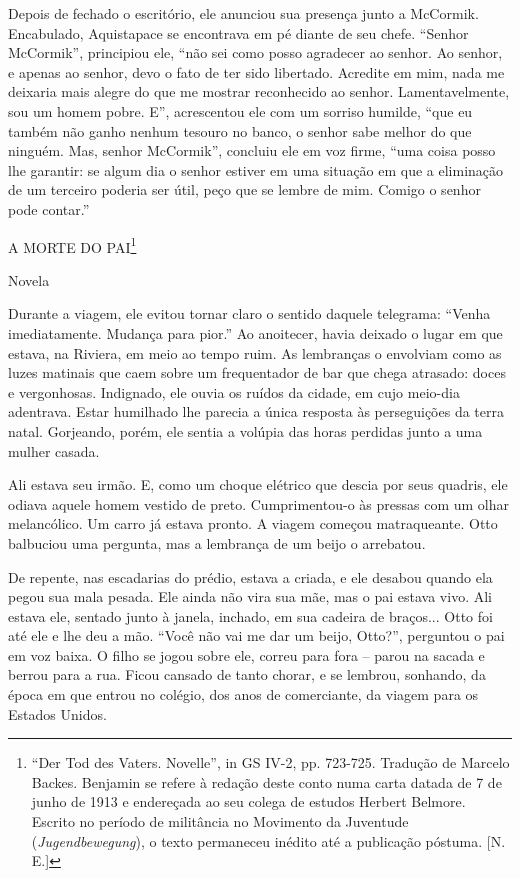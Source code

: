 Depois de fechado o escritório, ele anunciou sua presença junto a
McCormik. Encabulado, Aquistapace se encontrava em pé diante de seu
chefe. ``Senhor McCormik'', principiou ele, ``não sei como posso
agradecer ao senhor. Ao senhor, e apenas ao senhor, devo o fato de ter
sido libertado. Acredite em mim, nada me deixaria mais alegre do que me
mostrar reconhecido ao senhor. Lamentavelmente, sou um homem pobre. E'',
acrescentou ele com um sorriso humilde, ``que eu também não ganho nenhum
tesouro no banco, o senhor sabe melhor do que ninguém. Mas, senhor
McCormik'', concluiu ele em voz firme, ``uma coisa posso lhe garantir:
se algum dia o senhor estiver em uma situação em que a eliminação de um
terceiro poderia ser útil, peço que se lembre de mim. Comigo o senhor
pode contar.''

A MORTE DO PAI\footnote{``Der Tod des Vaters. Novelle'', in GS IV-2, pp.
  723-725. Tradução de Marcelo Backes. Benjamin se refere à redação
  deste conto numa carta datada de 7 de junho de 1913 e endereçada ao
  seu colega de estudos Herbert Belmore. Escrito no período de
  militância no Movimento da Juventude (\emph{Jugendbewegung}), o texto
  permaneceu inédito até a publicação póstuma. {[}N. E.{]}}

Novela

Durante a viagem, ele evitou tornar claro o sentido daquele telegrama:
``Venha imediatamente. Mudança para pior.'' Ao anoitecer, havia deixado
o lugar em que estava, na Riviera, em meio ao tempo ruim. As lembranças
o envolviam como as luzes matinais que caem sobre um frequentador de bar
que chega atrasado: doces e vergonhosas. Indignado, ele ouvia os ruídos
da cidade, em cujo meio-dia adentrava. Estar humilhado lhe parecia a
única resposta às perseguições da terra natal. Gorjeando, porém, ele
sentia a volúpia das horas perdidas junto a uma mulher casada.

Ali estava seu irmão. E, como um choque elétrico que descia por seus
quadris, ele odiava aquele homem vestido de preto. Cumprimentou-o às
pressas com um olhar melancólico. Um carro já estava pronto. A viagem
começou matraqueante. Otto balbuciou uma pergunta, mas a lembrança de um
beijo o arrebatou.

De repente, nas escadarias do prédio, estava a criada, e ele desabou
quando ela pegou sua mala pesada. Ele ainda não vira sua mãe, mas o pai
estava vivo. Ali estava ele, sentado junto à janela, inchado, em sua
cadeira de braços... Otto foi até ele e lhe deu a mão. ``Você não vai me
dar um beijo, Otto?'', perguntou o pai em voz baixa. O filho se jogou
sobre ele, correu para fora -- parou na sacada e berrou para a rua.
Ficou cansado de tanto chorar, e se lembrou, sonhando, da época em que
entrou no colégio, dos anos de comerciante, da viagem para os Estados
Unidos.

